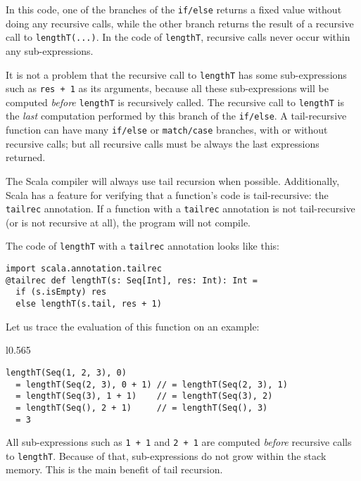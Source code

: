 \noindent In this code, one of the branches of the \lstinline!if/else!
returns a fixed value without doing any recursive calls, while the
other branch returns the result of a recursive call to \lstinline!lengthT(...)!.
In the code of \lstinline!lengthT!, recursive calls never occur within
any sub-expressions.

It is not a problem that the recursive call to \lstinline!lengthT!
has some sub-expressions such as \lstinline!res + 1! as its arguments,
because all these sub-expressions will be computed \emph{before} \lstinline!lengthT!
is recursively called. The recursive call to \lstinline!lengthT!
is the \emph{last} computation performed by this branch of the \lstinline!if/else!.
A tail-recursive function can have many \lstinline!if/else! or \lstinline!match/case!
branches, with or without recursive calls; but all recursive calls
must be always the last expressions returned.

The Scala compiler will always use tail recursion when possible. Additionally,
Scala has a feature for verifying that a function\textsf{'}s code is tail-recursive:
the \lstinline!tailrec! annotation. If a function with a \lstinline!tailrec!
annotation is not tail-recursive (or is not recursive at all), the
program will not compile.

The code of \lstinline!lengthT! with a \lstinline!tailrec! annotation
looks like this:
\begin{lstlisting}
import scala.annotation.tailrec
@tailrec def lengthT(s: Seq[Int], res: Int): Int = 
  if (s.isEmpty) res
  else lengthT(s.tail, res + 1)
\end{lstlisting}
Let us trace the evaluation of this function on an example:

\begin{wrapfigure}{l}{0.565\columnwidth}%
\vspace{-0.8\baselineskip}
\begin{lstlisting}
lengthT(Seq(1, 2, 3), 0)
  = lengthT(Seq(2, 3), 0 + 1) // = lengthT(Seq(2, 3), 1)
  = lengthT(Seq(3), 1 + 1)    // = lengthT(Seq(3), 2)
  = lengthT(Seq(), 2 + 1)     // = lengthT(Seq(), 3)
  = 3
\end{lstlisting}

\vspace{-1.5\baselineskip}
\end{wrapfigure}%

\noindent All sub-expressions such as \lstinline!1 + 1! and \lstinline!2 + 1!
are computed \emph{before} recursive calls to \lstinline!lengthT!.
Because of that, sub-expressions do not grow within the stack memory.
This is the main benefit of tail recursion.

